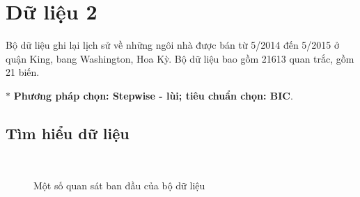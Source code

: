 \section{Dữ liệu 2}
Bộ dữ liệu ghi lại lịch sử về những ngôi nhà được bán từ 5/2014 đến 5/2015 ở quận King, bang Washington, Hoa Kỳ. Bộ dữ liệu bao gồm 21613 quan trắc, gồm 21 biến.

$*$ \textbf{Phương pháp chọn: Stepwise - lùi; tiêu chuẩn chọn: BIC}.

\subsection*{Tìm hiểu dữ liệu}
\begin{figure}[H]
\centering
{}\\
\hfill
{}\hfill
\caption{Một số quan sát ban đầu của bộ dữ liệu}
\end{figure}

